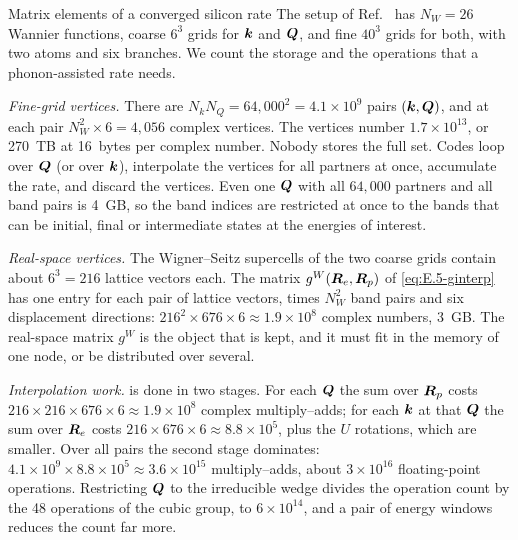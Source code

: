 \begin{workedexample}{Matrix elements of a converged silicon rate}\label{we:E-counts}
The setup of Ref.~\cite{noffsinger2012phonon} has $N_W = 26$ Wannier functions, coarse $6^3$ grids for $\bm{k}$ and $\bm{Q}$, and fine $40^3$ grids for both, with two atoms and six branches. We count the storage and the operations that a phonon-assisted rate needs.

\emph{Fine-grid vertices.} There are $N_k N_Q = 64{,}000^2 = 4.1\times10^9$ pairs $(\bm{k},\bm{Q})$, and at each pair $N_W^2\times6 = 4{,}056$ complex vertices. The vertices number $1.7\times10^{13}$, or \SI{270}{TB} at \SI{16}{bytes} per complex number. Nobody stores the full set. Codes loop over $\bm{Q}$ (or over $\bm{k}$), interpolate the vertices for all partners at once, accumulate the rate, and discard the vertices. Even one $\bm{Q}$ with all $64{,}000$ partners and all band pairs is \SI{4}{GB}, so the band indices are restricted at once to the bands that can be initial, final or intermediate states at the energies of interest.

\emph{Real-space vertices.} The Wigner--Seitz supercells of the two coarse grids contain about $6^3 = 216$ lattice vectors each. The matrix $g^W(\bm{R}_e,\bm{R}_p)$ of \cref{eq:E.5-ginterp} has one entry for each pair of lattice vectors, times $N_W^2$ band pairs and six displacement directions: $216^2\times676\times6 \approx 1.9\times10^8$ complex numbers, \SI{3}{GB}. The real-space matrix $g^W$ is the object that is kept, and it must fit in the memory of one node, or be distributed over several.

\emph{Interpolation work.}  is done in two stages. For each $\bm{Q}$ the sum over $\bm{R}_p$ costs $216\times216\times676\times6 \approx 1.9\times10^8$ complex multiply--adds; for each $\bm{k}$ at that $\bm{Q}$ the sum over $\bm{R}_e$ costs $216\times676\times6 \approx 8.8\times10^5$, plus the $U$ rotations, which are smaller. Over all pairs the second stage dominates: $4.1\times10^9\times8.8\times10^5 \approx 3.6\times10^{15}$ multiply--adds, about $3\times10^{16}$ floating-point operations. Restricting $\bm{Q}$ to the irreducible wedge divides the operation count by the 48 operations of the cubic group, to $6\times10^{14}$, and a pair of energy windows reduces the count far more.


\end{workedexample}
